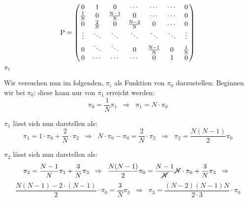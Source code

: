 {\begin{uebsp}
\begin{Answer}
\begin{equation*}
\normalsubformula{\text{P}}=\left(\begin{matrix}\normalsubformula{\text{0}}&\normalsubformula{\text{1}}&\normalsubformula{\text{0}}&\cdots
&\cdots &\cdots
&\normalsubformula{\text{0}}\\\frac{\normalsubformula{\text{1}}}{\normalsubformula{\text{N}}}&\normalsubformula{\text{0}}&\frac{\normalsubformula{\text{N}}-\normalsubformula{\text{1}}}{\normalsubformula{\text{N}}}&\normalsubformula{\text{0}}&\cdots
&\cdots
&\normalsubformula{\text{0}}\\\normalsubformula{\text{0}}&\frac{\normalsubformula{\text{2}}}{\normalsubformula{\text{N}}}&\normalsubformula{\text{0}}&\frac{\normalsubformula{\text{N}}-\normalsubformula{\text{2}}}{\normalsubformula{\text{N}}}&\normalsubformula{\text{0}}&\cdots
&\normalsubformula{\text{0}}\\\vdots &\ddots &\ddots &\ddots &\ddots
&\ddots &\vdots \\\normalsubformula{\text{0}}&\ddots &\ddots
&\normalsubformula{\text{0}}&\frac{\normalsubformula{\text{N}}-\normalsubformula{\text{1}}}{\normalsubformula{\text{N}}}&\normalsubformula{\text{0}}&\frac{\normalsubformula{\text{1}}}{\normalsubformula{\text{N}}}\\\normalsubformula{\text{0}}&\cdots
&\cdots &\cdots
&\normalsubformula{\text{0}}&\normalsubformula{\text{1}}&\normalsubformula{\text{0}}\end{matrix}\right)
\end{equation*}
 $\normalsubformula{\text{$\pi
$}}_{\normalsubformula{\text{i}}}\normalsubformula{\text{~}}$

Wir versuchen nun im folgenden, $\pi_i$ als Funktion von $\pi_0$ darzustellen:
Beginnen wir bei $\pi_0$: diese kann nur von $\pi_1$ erreicht werden:
\[\pi_0=\frac{1}{N}\pi_1\;\;\Rightarrow\;\;\pi_1=N\cdot \pi_0\]

$\pi_1$ lässt sich nun darstellen als:
\[\pi_1=1\cdot\pi_0+\frac{2}{N}\cdot\pi_2\;\;\Rightarrow\;\;
N\cdot\pi_0-\pi_0=\frac{2}{N}\cdot\pi_2\;\;\Rightarrow\;\;
\pi_2=\frac{N(N-1)}{2}\pi_0\]

$\pi_2$ lässt sich nun darstellen als:
\[\pi_2=\frac{N-1}{N}\pi_1+\frac{3}{N}\pi_3\;\;\Rightarrow\;\;\frac{N(N-1)}{2}\pi_0=\frac{N-1}{\cancel N}\cancel N\cdot \pi_0+\frac{3}{N}\pi_3\;\;\Rightarrow\;\;\]
\[\frac{N(N-1)-2\cdot (N-1)}{2}\cdot \pi_0=\frac{3}{N}\pi_3\;\;\Rightarrow\;\;\pi_3=\frac{(N-2)(N-1)N}{2\cdot 3}\cdot \pi_0\]


\end{Answer}
\end{uebsp}}
